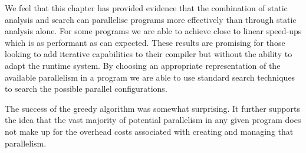 We feel that this chapter has provided evidence that the combination of static
analysis and search can parallelise programs more effectively than through
static analysis alone. For some programs we are able to achieve close to linear
speed-ups which is as performant as can expected. These results are promising
for those looking to add iterative capabilities to their compiler but without
the ability to adapt the runtime system. By choosing an appropriate
representation of the available parallelism in a program we are able to use
standard search techniques to search the possible parallel configurations.

The success of the greedy algorithm was somewhat surprising. It further
supports the idea that the vast majority of potential parallelism in any given
program does not make up for the overhead costs associated with creating and
managing that parallelism.
